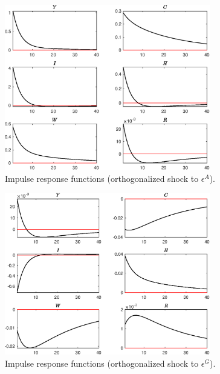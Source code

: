  
\begin{figure}[H]
\centering 
\includegraphics[width=0.80\textwidth]{RBClinear_hab/graphs/RBClinear_hab_IRF_epsA}
\caption{Impulse response functions (orthogonalized shock to ${\epsilon^{A}}$).}
\label{Fig:IRF:epsA}
\end{figure}
 
\begin{figure}[H]
\centering 
\includegraphics[width=0.80\textwidth]{RBClinear_hab/graphs/RBClinear_hab_IRF_epsG}
\caption{Impulse response functions (orthogonalized shock to ${\epsilon^{G}}$).}
\label{Fig:IRF:epsG}
\end{figure}
 
 
